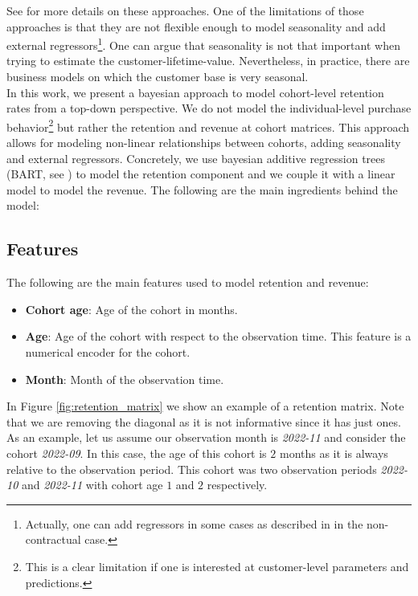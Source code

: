\documentclass[11pt]{amsart}
\begin{document}
See \cite{FaderHardieNote2017} for more details on these approaches. One of the
limitations of those approaches is that they are not flexible enough to model
seasonality and add external regressors\footnote{Actually, one can add regressors in
some cases as described in \cite{FaderHardieNote2007} in the non-contractual case.}.
One can argue that seasonality is not that important when trying to estimate the
customer-lifetime-value. Nevertheless, in practice, there are business models on which
the customer base is very seasonal. \\

In this work, we present a bayesian approach to model cohort-level retention rates from
a top-down perspective. We do not model the individual-level purchase
behavior\footnote{This is a clear limitation if one is interested at customer-level
parameters and predictions.} but rather the retention and revenue at cohort matrices.
This approach allows for modeling non-linear relationships between cohorts, adding
seasonality and external regressors. Concretely, we use bayesian additive regression
trees (BART, see \cite{quiroga2022bart}) to model the retention component and we couple
it with a linear model to model the revenue. The following are the main ingredients 
behind the model:


\subsection*{Features}
The following are the main features used to model retention and revenue:
\begin{itemize}
    \item {\bf Cohort age}: Age of the cohort in months.
    \item {\bf Age}: Age of the cohort with respect to the observation time.
        This feature is a numerical encoder for the cohort.
    \item {\bf Month}: Month of the observation time.
\end{itemize}

In Figure \ref{fig:retention_matrix} we show an example of a retention matrix. Note
that we are removing the diagonal as it is not informative since it has just ones. As
an example, let us assume our observation month is {\em 2022-11} and consider the cohort
{\em 2022-09}. In this case, the age of this cohort is $2$ months as it is always
relative to the observation period. This cohort was two observation periods
{\em 2022-10} and {\em 2022-11} with cohort age $1$ and $2$ respectively.\\
\end{document}
